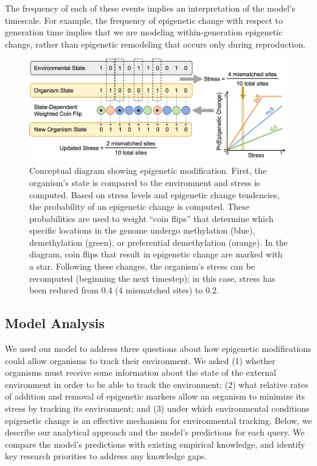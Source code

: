 \documentclass{article}
\begin{document}
The frequency of each of these events implies an interpretation of the model's timescale. For example, the frequency of epigenetic change with respect to generation time implies that we are modeling within-generation epigenetic change, rather than epigenetic remodeling that occurs only during reproduction.


\begin{figure}
    \centering
    \includegraphics[width=\textwidth]{Figures/ModelDiag_v1.png}
    \caption{Conceptual diagram showing epigenetic modification. First, the organism's state is compared to the environment and stress is computed. Based on stress levels and epigenetic change tendencies, the probability of an epigenetic change is computed. These probabilities are used to weight ``coin flips'' that determine which specific locations in the genome undergo methylation (blue), demethylation (green), or preferential demethylation (orange). In the diagram, coin flips that result in epigenetic change are marked with a star. Following these changes, the organism's stress can be recomputed (beginning the next timestep); in this case, stress has been reduced from 0.4 (4 mismatched sites) to 0.2.}
    \label{fig:modeldiag}
\end{figure}

\subsection{Model Analysis}
We used our model to address three questions about how epigenetic modifications could allow organisms to track their environment. We asked (1) whether organisms must receive some information about the state of the external environment in order to be able to track the environment; (2) what relative rates of addition and removal of epigenetic markers allow an organism to minimize its stress by tracking its environment; and (3) under which environmental conditions epigenetic change is an effective mechanism for environmental tracking. Below, we describe our analytical approach and the model's predictions for each query. We compare the model's predictions with existing empirical knowledge, and identify key research priorities to address any knowledge gaps.
\end{document}
